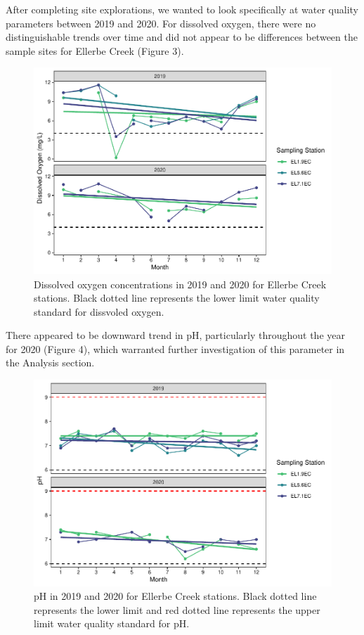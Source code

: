 \documentclass[
  12pt,
]{article}
\begin{document}
After completing site explorations, we wanted to look specifically at
water quality parameters between 2019 and 2020. For dissolved oxygen,
there were no distinguishable trends over time and did not appear to be
differences between the sample sites for Ellerbe Creek (Figure 3).

\begin{figure}
\centering
\includegraphics{August_Lindborg_ENV872_Project_files/figure-latex/unnamed-chunk-15-1.pdf}
\caption{Dissolved oxygen concentrations in 2019 and 2020 for Ellerbe
Creek stations. Black dotted line represents the lower limit water
quality standard for dissvoled oxygen.}
\end{figure}

There appeared to be downward trend in pH, particularly throughout the
year for 2020 (Figure 4), which warranted further investigation of this
parameter in the Analysis section.

\begin{figure}
\centering
\includegraphics{August_Lindborg_ENV872_Project_files/figure-latex/unnamed-chunk-16-1.pdf}
\caption{pH in 2019 and 2020 for Ellerbe Creek stations. Black dotted
line represents the lower limit and red dotted line represents the upper
limit water quality standard for pH.}
\end{figure}
\end{document}
